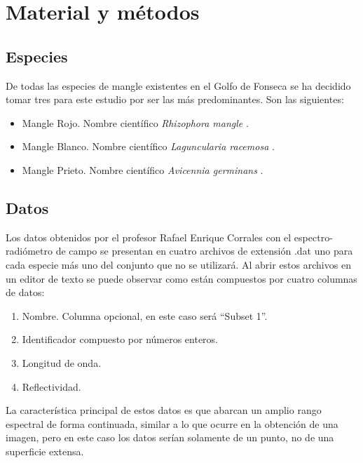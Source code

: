 


\chapter{Material y métodos}
\label{cap:materialymetodos}

\section{Especies}
De todas las especies de mangle existentes en el Golfo de Fonseca se ha decidido tomar tres para este estudio por ser las más predominantes. Son las siguientes:

\begin{itemize}
	\item Mangle Rojo. Nombre científico \textit{Rhizophora mangle} \citep{JimenezRhizophora}.
	\item Mangle Blanco. Nombre científico \textit{Laguncularia racemosa} \citep{JimenezLaguncularia}.
	\item Mangle Prieto. Nombre científico \textit{Avicennia germinans} \citep{JimenezAvicennia}.
\end{itemize}

\section{Datos}
\label{sec:datos}
Los datos obtenidos por el profesor Rafael Enrique Corrales con el espectro-radiómetro de campo se presentan en cuatro archivos de extensión .dat uno para cada especie más uno del conjunto que no se utilizará. Al abrir estos archivos en un editor de texto se puede observar como están compuestos por 
cuatro columnas de datos:

\begin{enumerate}
	\item Nombre. Columna opcional, en este caso será ``Subset 1''.
	\item Identificador compuesto por números enteros.
	\item Longitud de onda.
	\item Reflectividad.
\end{enumerate}

La característica principal de estos datos es que abarcan un amplio rango espectral de forma continuada, similar a lo que ocurre en la obtención de una imagen, pero en este caso los datos serían solamente de un punto, no de una superficie extensa.\Sep

